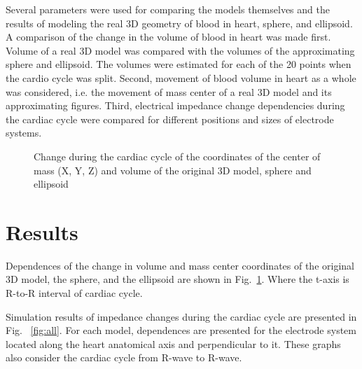 \documentclass[conference]{IEEEtran}
\begin{document}
Several parameters were used for comparing the models themselves and the results of modeling the real 3D geometry of blood in heart, sphere, and ellipsoid.
A comparison of the change in the volume of blood in heart was made first.
Volume of a real 3D model was compared with the volumes of the approximating sphere and ellipsoid.
The volumes were estimated for each of the 20 points when the cardio cycle was split.
Second, movement of blood volume in heart as a whole was considered,
i.e. the movement of mass center of a real 3D model and its approximating figures.
Third, electrical impedance change dependencies during the cardiac cycle were compared for different positions and sizes of electrode systems.

\begin{figure}[htbp]
    \caption{Change during the cardiac cycle of the coordinates of the center of mass (X, Y, Z) and volume of the original 3D model, sphere and ellipsoid}
    \label{fig:rxyz}
\end{figure}

\section{Results}

Dependences of the change in volume and mass center coordinates of the original 3D model, the sphere, and the ellipsoid are shown in
Fig.~\ref{fig:rxyz}.
Where the t-axis is R-to-R interval of cardiac cycle.

Simulation results of impedance changes during the cardiac cycle are presented in
 Fig. ~\ref{fig:all}.
For each model, dependences are presented for the electrode system located along the heart anatomical axis and perpendicular to it.
These graphs also consider the cardiac cycle from R-wave to R-wave.
\end{document}
